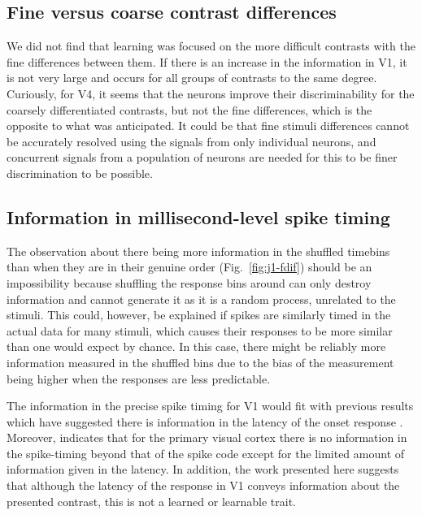 \subsection{Fine versus coarse contrast differences}

We did not find that learning was focused on the more difficult contrasts with the fine differences between them. If there is an increase in the information in V1, it is not very large and occurs for all groups of contrasts to the same degree. Curiously, for V4, it seems that the neurons improve their discriminability for the coarsely differentiated contrasts, but not the fine differences, which is the opposite to what was anticipated. It could be that fine stimuli differences cannot be accurately resolved using the signals from only individual neurons, and concurrent signals from a population of neurons are needed for this to be finer discrimination to be possible.

\subsection{Information in millisecond-level spike timing}

The observation about there being more information in the shuffled timebins than when they are in their genuine order (Fig.~\ref{fig:j1-fdif}) should be an impossibility because shuffling the response bins around can only destroy information and cannot generate it as it is a random process, unrelated to the stimuli.
This could, however, be explained if spikes are similarly timed in the actual data for many stimuli, which causes their responses to be more similar than one would expect by chance. In this case, there might be reliably more information measured in the shuffled bins due to the bias of the measurement being higher when the responses are less predictable.

The information in the precise spike timing for V1 would fit with previous results which have suggested there is information in the latency of the onset response
\cite{Reich2001,Tovee1993,Rolls2011}.
Moreover, \cite{Tovee1993,Rolls2011} indicates that for the primary visual cortex there is no information in the spike-timing beyond that of the spike code except for the limited amount of information given in the latency.
In addition, the work presented here suggests that although the latency of the response in V1 conveys information about the presented contrast, this is not a learned or learnable trait.


